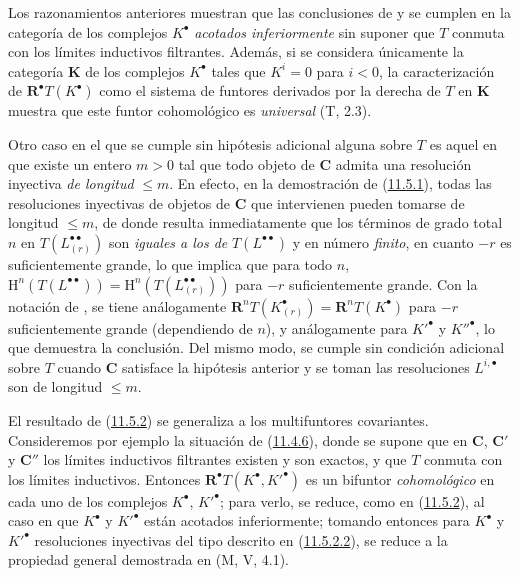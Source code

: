 \begin{remark}[11.5.4]
\label{0.11.5.4}
\label{0.11.5.4-fr}
Los razonamientos anteriores muestran que las conclusiones de  y  se cumplen en la categoría de los complejos $K^\bullet$ \emph{acotados inferiormente} sin suponer que $T$ conmuta con los límites inductivos filtrantes.
Además, si se considera únicamente la categoría $\boldsymbol{K}$ de los complejos $K^\bullet$ tales que $K^i=0$ para $i<0$, la caracterización de $\mathbf R^\bullet T(K^\bullet)$ como el sistema de funtores derivados por la derecha de $T$ en $\boldsymbol{K}$ muestra que este funtor cohomológico es \emph{universal} (T, 2.3).

Otro caso en el que  se cumple sin hipótesis adicional alguna sobre $T$ es aquel en que existe un entero $m>0$ tal que todo objeto de $\boldsymbol{C}$ admita una resolución inyectiva \emph{de longitud} $\leq m$. En efecto, en la demostración de (\hyperref[0.11.5.1-fr]{11.5.1}), todas las resoluciones inyectivas de objetos de $\boldsymbol{C}$ que intervienen pueden tomarse de longitud $\leq m$, de donde resulta inmediatamente que los términos de grado total $n$ en $T(L_{(r)}^{\bullet\bullet})$ son \emph{iguales a los de} $T(L^{\bullet\bullet})$ y en número \emph{finito}, en cuanto $-r$ es suficientemente grande, lo que implica que para todo $n$,
$\mathrm H^n(T(L^{\bullet\bullet}))=
\mathrm H^n(T(L_{(r)}^{\bullet\bullet}))$
para $-r$ suficientemente grande.
Con la notación de , se tiene análogamente
$\mathbf R^nT(K_{(r)}^\bullet)=\mathbf R^nT(K^\bullet)$
para $-r$ suficientemente grande (dependiendo de $n$), y análogamente para $K'^\bullet$ y $K''^\bullet$, lo que demuestra la conclusión.
Del mismo modo,  se cumple sin condición adicional sobre $T$ cuando $\boldsymbol{C}$ satisface la hipótesis anterior y se toman las resoluciones $L^{i,\bullet}$ son de longitud $\leq m$.
\end{remark}

\begin{env}[11.5.5]
\label{0.11.5.5-fr}
El resultado de (\hyperref[0.11.5.2-fr]{11.5.2}) se generaliza a los multifuntores covariantes. Consideremos por ejemplo la situación de (\hyperref[0.11.4.6-fr]{11.4.6}), donde se supone que en $\boldsymbol{C}$, $\boldsymbol{C}'$ y $\boldsymbol{C}''$
los límites inductivos filtrantes existen y son exactos, y que $T$ conmuta con los límites inductivos. Entonces $\mathbf R^\bullet T(K^\bullet,K'^\bullet)$ es un bifuntor \emph{cohomológico} en cada uno de los complejos $K^\bullet$, $K'^\bullet$; para verlo, se reduce, como en (\hyperref[0.11.5.2-fr]{11.5.2}), al caso en que $K^\bullet$ y $K'^\bullet$ están acotados inferiormente; tomando entonces para $K^\bullet$ y $K'^\bullet$ resoluciones inyectivas del tipo descrito en (\hyperref[0.11.5.2.2-fr]{11.5.2.2}), se reduce a la propiedad general demostrada en (M, V, 4.1).
\end{env}

